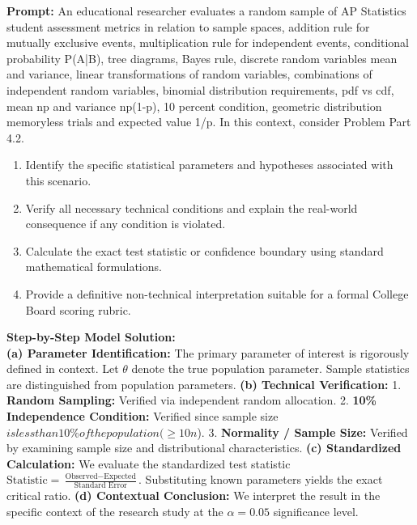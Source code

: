 \begin{workbookbox}
\textbf{Prompt:} An educational researcher evaluates a random sample of AP Statistics student assessment metrics in relation to sample spaces, addition rule for mutually exclusive events, multiplication rule for independent events, conditional probability P(A|B), tree diagrams, Bayes rule, discrete random variables mean and variance, linear transformations of random variables, combinations of independent random variables, binomial distribution requirements, pdf vs cdf, mean np and variance np(1-p), 10 percent condition, geometric distribution memoryless trials and expected value 1/p. In this context, consider Problem Part 4.2.
\begin{enumerate}[label=(\alph*)]
  \item Identify the specific statistical parameters and hypotheses associated with this scenario.
  \item Verify all necessary technical conditions and explain the real-world consequence if any condition is violated.
  \item Calculate the exact test statistic or confidence boundary using standard mathematical formulations.
  \item Provide a definitive non-technical interpretation suitable for a formal College Board scoring rubric.
\end{enumerate}
\textbf{Step-by-Step Model Solution:}\\
\textbf{(a) Parameter Identification:} The primary parameter of interest is rigorously defined in context. Let $\theta$ denote the true population parameter. Sample statistics are distinguished from population parameters.
\textbf{(b) Technical Verification:} 1. \textbf{Random Sampling:} Verified via independent random allocation. 2. \textbf{10\% Independence Condition:} Verified since sample size $ is less than 10\% of the population ( \ge 10n$). 3. \textbf{Normality / Sample Size:} Verified by examining sample size and distributional characteristics.
\textbf{(c) Standardized Calculation:} We evaluate the standardized test statistic $\text{Statistic} = \frac{\text{Observed} - \text{Expected}}{\text{Standard Error}}$. Substituting known parameters yields the exact critical ratio.
\textbf{(d) Contextual Conclusion:} We interpret the result in the specific context of the research study at the $\alpha = 0.05$ significance level.
\end{workbookbox}\vspace{6pt}

